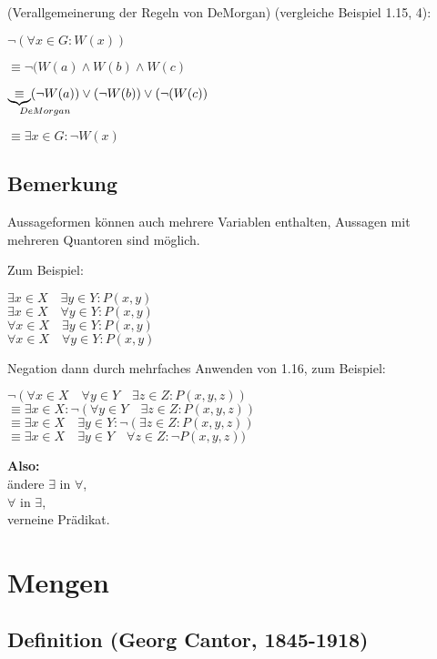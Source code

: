\documentclass[a4paper, 12pt, twoside] {article}
\begin{document}
(Verallgemeinerung der Regeln von DeMorgan)
(vergleiche Beispiel 1.15, 4):

$\neg (\forall x \in G: W(x))$

$\equiv \neg (W(a) \wedge W(b) \wedge W(c)$

$\underbrace{\equiv}_{\mathrlap{DeMorgan}} (\neg W(a)) \lor (\neg W(b)) \lor (\neg (W(c))$

$\equiv \exists x \in G: \neg W(x)$


\subsection*{Bemerkung}
Aussageformen können auch mehrere Variablen enthalten, Aussagen mit mehreren Quantoren sind möglich.

Zum Beispiel:

$\exists x \in X \quad \exists y \in Y: P(x,y)$ \\
$\exists x \in X \quad \forall y \in Y: P(x,y)$ \\
$\forall x \in X \quad \exists y \in Y: P(x,y)$ \\
$\forall x \in X \quad \forall y \in Y: P(x,y)$

Negation dann durch mehrfaches Anwenden von 1.16, zum Beispiel:

$\neg (\forall x \in X \quad \forall y \in Y \quad \exists z \in Z : P(x,y,z))$ \\
$\equiv \exists x \in X : \neg (\forall y \in Y \quad \exists z \in Z : P(x,y,z))$ \\
$\equiv \exists x \in X \quad \exists y \in Y : \neg (\exists z \in Z : P(x,y,z))$ \\
$\equiv \exists x \in X \quad \exists y \in Y \quad \forall z \in Z : \neg P(x,y,z))$

\textbf{Also: }\\
ändere $\exists$ in $\forall$, \\
\text{\qquad \quad} $\forall$ in $\exists$, \\
verneine Prädikat.

\section{Mengen}

\subsection{Definition (Georg Cantor, 1845-1918)}
\end{document}
